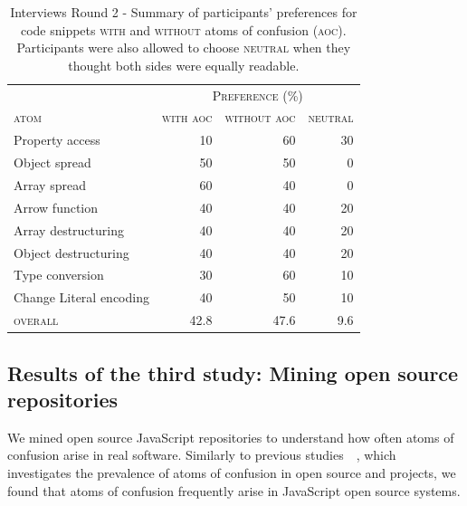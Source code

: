 \begin{table}[!htb]
    \centering
    \caption{Interviews Round 2 - Summary of participants' preferences for code snippets \textsc{with} and \textsc{without} atoms of confusion (\textsc{aoc}). Participants were also allowed to choose \textsc{neutral} when they thought both sides were equally readable.}
    \label{tab:interview-results2}
    \begin{tabular}{lrrr}\toprule
      & \multicolumn{3}{c}{\textsc{Preference (\%)}} \\
      \cmidrule(lr){2-4}
         \textsc{atom}           & \multicolumn{1}{c}{\textsc{with aoc}}
                                      &  \multicolumn{1}{c}{\textsc{without aoc}}
                                               & \multicolumn{1}{c}{\textsc{neutral}} \\ \midrule
         Property access         & 10  & 60  & 30  \\
         Object spread           & 50 & 50     & 0    \\
         Array spread            & 60  & 40    & 0     \\
         Arrow function          & 40 & 40     & 20  \\
         Array destructuring     & 40 & 40  & 20  \\
         Object destructuring    & 40 & 40     & 20    \\
         Type conversion         & 30  & 60    & 10     \\
         Change Literal encoding & 40 & 50  & 10  \\ \midrule
         \textsc{overall}        & 42.8 & 47.6  & 9.6  \\
         \bottomrule
    \end{tabular}
\end{table}

\subsection{Results of the third study: Mining open source repositories}
\label{sec:msr-results} 

We mined \minedprojects open source JavaScript repositories to understand how often atoms of confusion arise in real software. Similarly to previous studies~\cite{DBLP:conf/msr/GopsteinZFC18}~\cite{DBLP:journals/ese/MedeirosLAAKRG19}, which investigates the prevalence of atoms of confusion in open source \clang and \cpplang projects, we found that atoms of confusion frequently arise in JavaScript open source systems.

